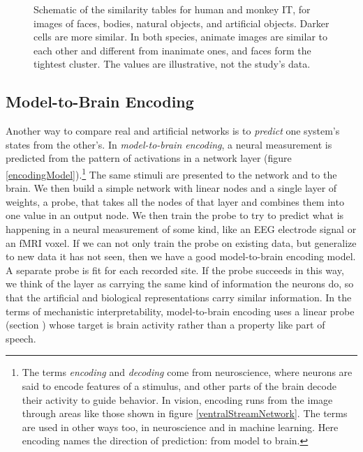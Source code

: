 \begin{figure}[htbp]
\centering
{}
\caption[Jeff Yoshimi, based on \cite{kriegeskorte2008matching}.]{Schematic of the similarity tables for human and monkey IT, for images of faces, bodies, natural objects, and artificial objects. Darker cells are more similar. In both species, animate images are similar to each other and different from inanimate ones, and faces form the tightest cluster. The values are illustrative, not the study's data.}
\label{rsaHumanMonkey}
\end{figure}

\subsection{Model-to-Brain Encoding}\label{encodingDecoding}

Another way to compare real and artificial networks is to \emph{predict} one system's states from the other's. In \emph{model-to-brain encoding}, a neural measurement is predicted from the pattern of activations in a network layer (figure \ref{encodingModel}).\footnote{The terms \emph{encoding} and \emph{decoding} come from neuroscience, where neurons are said to encode features of a stimulus, and other parts of the brain decode their activity to guide behavior. In vision, encoding runs from the image through areas like those shown in figure \ref{ventralStreamNetwork}. The terms are used in other ways too, in neuroscience and in machine learning. Here encoding names the direction of prediction: from model to brain.} The same stimuli are presented to the network and to the brain. We then build a simple network with linear nodes and a single layer of weights, a probe, that takes all the nodes of that layer and combines them into one value in an output node. We then train the probe to try to predict what is happening in a neural measurement of some kind, like an EEG electrode signal or an fMRI voxel. If we can not only train the probe on existing data, but generalize to new data it has not seen, then we have a good model-to-brain encoding model. A separate probe is fit for each recorded site. If the probe succeeds in this way, we think of the layer as carrying the same kind of information the neurons do, so that the artificial and biological representations carry similar information. In the terms of mechanistic interpretability, model-to-brain encoding uses a linear probe (section ) whose target is brain activity rather than a property like part of speech. 

